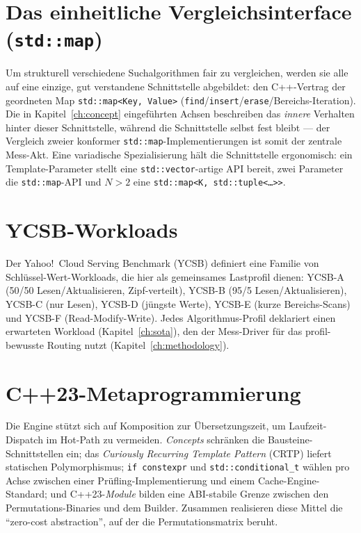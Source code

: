 \section{Das einheitliche Vergleichsinterface (\texorpdfstring{\texttt{std::map}}{std::map})}\label{sec:stdmap-interface}

Um strukturell verschiedene Suchalgorithmen fair zu vergleichen, werden sie alle auf eine
einzige, gut verstandene Schnittstelle abgebildet: den C++-Vertrag der geordneten Map
\texttt{std::map<Key,\,Value>} (\texttt{find}/\texttt{insert}/\texttt{erase}/Bereichs-Iteration).
Die in Kapitel~\ref{ch:concept} eingeführten Achsen beschreiben das \emph{innere} Verhalten
hinter dieser Schnittstelle, während die Schnittstelle selbst fest bleibt --- der Vergleich
zweier konformer \texttt{std::map}-Implementierungen ist somit der zentrale Mess-Akt. Eine
variadische Spezialisierung hält die Schnittstelle ergonomisch: ein Template-Parameter stellt
eine \texttt{std::vector}-artige API bereit, zwei Parameter die \texttt{std::map}-API und
$N>2$ eine \texttt{std::map<K,\,std::tuple<\ldots>>}.

\section{YCSB-Workloads}\label{sec:ycsb}

Der Yahoo!\ Cloud Serving Benchmark (YCSB) definiert eine Familie von Schlüssel-Wert-Workloads,
die hier als gemeinsames Lastprofil dienen: YCSB-A (50/50 Lesen/Aktualisieren, Zipf-verteilt),
YCSB-B (95/5 Lesen/Aktualisieren), YCSB-C (nur Lesen), YCSB-D (jüngste Werte), YCSB-E (kurze
Bereichs-Scans) und YCSB-F (Read-Modify-Write). Jedes Algorithmus-Profil deklariert einen
erwarteten Workload (Kapitel~\ref{ch:sota}), den der Mess-Driver für das profil-bewusste
Routing nutzt (Kapitel~\ref{ch:methodology}).

\section{C++23-Metaprogrammierung}\label{sec:cpp23}

Die Engine stützt sich auf Komposition zur Übersetzungszeit, um Laufzeit-Dispatch im
Hot-Path zu vermeiden. \emph{Concepts} schränken die Bausteine-Schnittstellen ein; das
\emph{Curiously Recurring Template Pattern} (CRTP) liefert statischen Polymorphismus;
\texttt{if~constexpr} und \texttt{std::conditional\_t} wählen pro Achse zwischen einer
Prüfling-Implementierung und einem Cache-Engine-Standard; und C++23-\emph{Module} bilden eine
ABI-stabile Grenze zwischen den Permutations-Binaries und dem Builder. Zusammen realisieren
diese Mittel die ``zero-cost abstraction'', auf der die Permutationsmatrix beruht.
